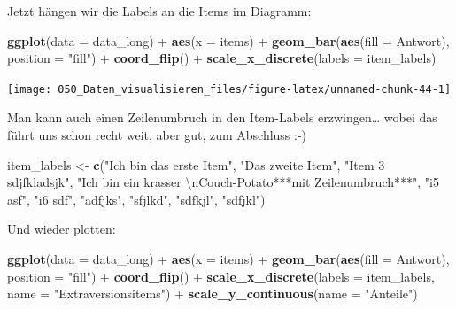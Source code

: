 \documentclass[12pt,]{book}
\newenvironment{Shaded}{\begin{snugshade}}{\end{snugshade}}
\newcommand{\KeywordTok}[1]{\textcolor[rgb]{0.13,0.29,0.53}{\textbf{{#1}}}}
\newcommand{\DataTypeTok}[1]{\textcolor[rgb]{0.13,0.29,0.53}{{#1}}}
\newcommand{\CharTok}[1]{\textcolor[rgb]{0.31,0.60,0.02}{{#1}}}
\newcommand{\StringTok}[1]{\textcolor[rgb]{0.31,0.60,0.02}{{#1}}}
\newcommand{\NormalTok}[1]{{#1}}
\begin{document}
Jetzt hängen wir die Labels an die Items im Diagramm:

\begin{Shaded}
\begin{Highlighting}[]
\KeywordTok{ggplot}\NormalTok{(}\DataTypeTok{data =} \NormalTok{data_long) +}
\StringTok{  }\KeywordTok{aes}\NormalTok{(}\DataTypeTok{x =} \NormalTok{items)  +}
\StringTok{  }\KeywordTok{geom_bar}\NormalTok{(}\KeywordTok{aes}\NormalTok{(}\DataTypeTok{fill =} \NormalTok{Antwort), }\DataTypeTok{position =} \StringTok{"fill"}\NormalTok{) +}
\StringTok{  }\KeywordTok{coord_flip}\NormalTok{() +}
\StringTok{  }\KeywordTok{scale_x_discrete}\NormalTok{(}\DataTypeTok{labels =} \NormalTok{item_labels)}
\end{Highlighting}
\end{Shaded}

\begin{center}\texttt{[image: 050\_Daten\_visualisieren\_files/figure-latex/unnamed-chunk-44-1]} \end{center}

Man kann auch einen Zeilenumbruch in den Item-Labels erzwingen\ldots{}
wobei das führt uns schon recht weit, aber gut, zum Abschluss :-)

\begin{Shaded}
\begin{Highlighting}[]
\NormalTok{item_labels <-}\StringTok{ }\KeywordTok{c}\NormalTok{(}\StringTok{"Ich bin das erste Item"}\NormalTok{,}
                 \StringTok{"Das zweite Item"}\NormalTok{,}
                 \StringTok{"Item 3 sdjfkladsjk"}\NormalTok{,}
                 \StringTok{"Ich bin ein krasser }\CharTok{\textbackslash{}n}\StringTok{Couch-Potato***mit Zeilenumbruch***"}\NormalTok{,}
\StringTok{"i5 asf"}\NormalTok{, }\StringTok{"i6 sdf"}\NormalTok{, }\StringTok{"adfjks"}\NormalTok{, }\StringTok{"sfjlkd"}\NormalTok{, }\StringTok{"sdfkjl"}\NormalTok{, }\StringTok{"sdfjkl"}\NormalTok{)}
\end{Highlighting}
\end{Shaded}

Und wieder plotten:

\begin{Shaded}
\begin{Highlighting}[]
\KeywordTok{ggplot}\NormalTok{(}\DataTypeTok{data =} \NormalTok{data_long) +}
\StringTok{  }\KeywordTok{aes}\NormalTok{(}\DataTypeTok{x =} \NormalTok{items)  +}
\StringTok{  }\KeywordTok{geom_bar}\NormalTok{(}\KeywordTok{aes}\NormalTok{(}\DataTypeTok{fill =} \NormalTok{Antwort), }\DataTypeTok{position =} \StringTok{"fill"}\NormalTok{) +}
\StringTok{  }\KeywordTok{coord_flip}\NormalTok{() +}
\StringTok{  }\KeywordTok{scale_x_discrete}\NormalTok{(}\DataTypeTok{labels =} \NormalTok{item_labels, }\DataTypeTok{name =} \StringTok{"Extraversionsitems"}\NormalTok{) +}
\StringTok{  }\KeywordTok{scale_y_continuous}\NormalTok{(}\DataTypeTok{name =} \StringTok{"Anteile"}\NormalTok{)}
\end{Highlighting}
\end{Shaded}
\end{document}
